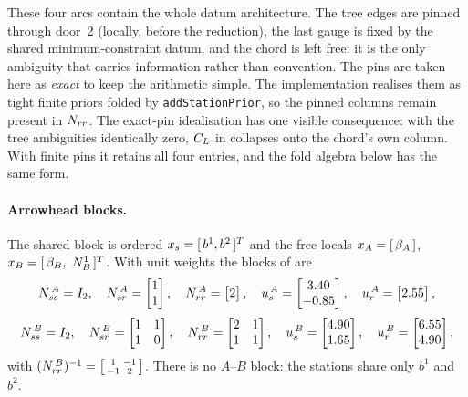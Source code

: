 \documentclass[main.tex]{subfiles}
\begin{document}
These four arcs contain the whole datum architecture.  The tree edges
are pinned through door~2 (locally, before the reduction), the last
gauge is fixed by the shared minimum-constraint datum, and the chord is
left free: it is the only ambiguity that carries information rather
than convention.  The pins are taken here as \emph{exact} to keep the
arithmetic simple.  The implementation realises them as tight finite
priors folded by \texttt{addStationPrior}, so the pinned columns remain
present in $N_{rr}$.  The exact-pin idealisation has one visible
consequence: with the tree ambiguities identically zero, $C_L$ in
 collapses onto the chord's own column.  With finite
pins it retains all four entries, and the fold algebra below has the
same form.

\paragraph{Arrowhead blocks.}
The shared block is ordered $x_s = [\,b^1, b^2\,]^{T}$ and the
free locals $x_{A} = [\,\beta_A\,]$, $x_{B} =
[\,\beta_B,\ N^1_B\,]^{T}$.  With unit weights the blocks of
 are
\[
N_{ss}^{\,A} = I_2,\quad
N_{sr}^{\,A} = \begin{bmatrix}1\\1\end{bmatrix},\quad
N_{rr}^{\,A} = \begin{bmatrix}2\end{bmatrix},\quad
u_s^{\,A} = \begin{bmatrix}3.40\\-0.85\end{bmatrix},\quad
u_r^{\,A} = \begin{bmatrix}2.55\end{bmatrix},
\]
\[
N_{ss}^{\,B} = I_2,\quad
N_{sr}^{\,B} = \begin{bmatrix}1&1\\1&0\end{bmatrix},\quad
N_{rr}^{\,B} = \begin{bmatrix}2&1\\1&1\end{bmatrix},\quad
u_s^{\,B} = \begin{bmatrix}4.90\\1.65\end{bmatrix},\quad
u_r^{\,B} = \begin{bmatrix}6.55\\4.90\end{bmatrix},
\]
with $(N_{rr}^{\,B})^{-1} = \left[\begin{smallmatrix}1&-1\\-1&2
\end{smallmatrix}\right]$.  There is no $A$--$B$ block: the stations
share only $b^1$ and $b^2$.
\end{document}
